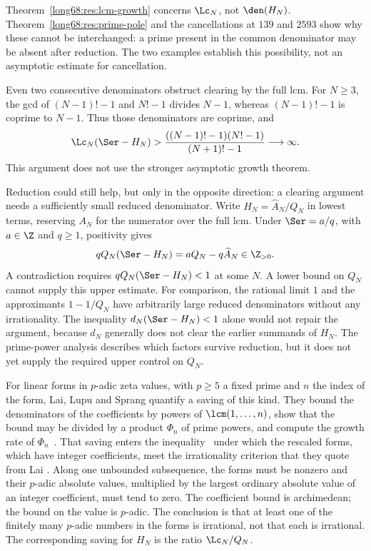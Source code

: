 Theorem~\ref{long68:res:lcm-growth} concerns $\Lc_N$, not $\den(H_N)$.
Theorem~\ref{long68:res:prime-pole} and the cancellations at $139$ and $2593$
show why these cannot be interchanged: a prime present in the common
denominator may be absent after reduction. The two examples establish this
possibility, not an asymptotic estimate for cancellation.

Even two consecutive denominators obstruct clearing by the full lcm. For
$N\ge3$, the gcd of $(N-1)!-1$ and $N!-1$ divides $N-1$, whereas
$(N-1)!-1$ is coprime to $N-1$. Thus those denominators are coprime, and
\[
\Lc_N(\Ser-H_N)>
\frac{((N-1)!-1)(N!-1)}{(N+1)!-1}\longrightarrow\infty.
\]
This argument does not use the stronger asymptotic growth theorem.

Reduction could still help, but only in the opposite direction: a
clearing argument needs a sufficiently small reduced denominator.
Write $H_N=\widehat A_N/Q_N$ in lowest terms, reserving $A_N$ for the
numerator over the full lcm. Under $\Ser=a/q$, with $a\in\Z$ and
$q\ge1$, positivity gives
\[
 qQ_N(\Ser-H_N)=aQ_N-q\widehat A_N\in\Z_{>0}.
\]
A contradiction requires $qQ_N(\Ser-H_N)<1$ at some $N$. A lower
bound on $Q_N$ cannot supply this upper estimate. For comparison, the
rational limit $1$ and the approximants
$1-1/Q_N$ have arbitrarily large reduced denominators without any
irrationality.  The inequality $d_N(\Ser-H_N)<1$ alone would not repair the
argument, because $d_N$ generally does not clear the earlier summands of
$H_N$.  The prime-power analysis describes which factors survive reduction,
but it does not yet supply the required upper control on $Q_N$.

For linear forms in $p$-adic zeta values, with $p\ge5$ a fixed prime and $n$
the index of the form, Lai, Lupu and Sprang quantify a saving of this kind.
They bound the denominators of the coefficients by powers of
$\lcm(1,\ldots,n)$, show that the bound may be divided by a product $\Phi_n$
of prime powers, and compute the growth rate of
$\Phi_n$~\cite[Lemmas~5.3--5.7 and~7.3]{lai-lupu-sprang}.  That saving enters
the inequality~\cite[(8.1)]{lai-lupu-sprang} under which the rescaled forms,
which have integer coefficients, meet the irrationality criterion
\cite[Lemma~2.1, p.~3]{lai-lupu-sprang} that they quote from Lai
\cite[Lemma~2.1, p.~4]{lai-2adic}. Along one unbounded subsequence, the forms
must be nonzero and their $p$-adic absolute values, multiplied by the
largest ordinary absolute value of an integer coefficient, must tend to
zero. The coefficient bound is archimedean; the bound on the value is
$p$-adic. The conclusion is that at least one of the finitely many
$p$-adic numbers in the forms is irrational, not that each is irrational.
The corresponding saving for $H_N$ is the ratio $\Lc_N/Q_N$.

